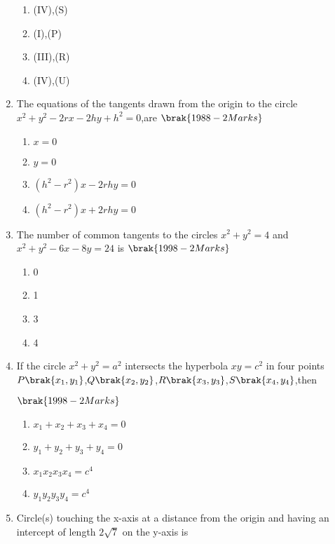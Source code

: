 \begin{enumerate}
\begin{enumerate}[label=(\alph*)] 
 \item (IV),(S)
 \item (I),(P)
 \item (III),(R)    
 \item (IV),(U)

  
  \end{enumerate}
\item The equations of the tangents drawn from the origin to the circle $x^2+y^2-2rx-2hy+h^2=0$,are
    \hfill$\brak{1988-2 Marks}$
    \begin{multicols}{2}
\begin{enumerate}
    \item $x=0$
    \item $y=0$
    \item $(h^2-r^2)x-2rhy=0$
    \item $(h^2-r^2)x+2rhy=0$
\end{enumerate}
\end{multicols}
\item The number of common tangents to the circles $x^2+y^2=4$ and $x^2+y^2-6x-8y=24$ is 
    \hfill$\brak{1998-2 Marks}$
    \begin{multicols}{2}
\begin{enumerate}
    \item 0
    \item 1 
    \item 3
    \item 4
\end{enumerate}
\end{multicols}
\item If the circle $x^2+y^2=a^2$ intersects the hyperbola $xy=c^2$ in four points $P\brak{x_1,y_1}$,$Q\brak{x_2,y_2}$,$R\brak{x_3,y_3}$,$S\brak{x_4,y_4}$,then

    \hfill$\brak{1998-2 Marks}$
\begin{multicols}{2}
\begin{enumerate}
    \item $x_1+x_2+x_3+x_4=0$
    \item $y_1+y_2+y_3+y_4=0$
    \item $x_1x_2x_3x_4=c^4$
    \item $y_1y_2y_3y_4=c^4$

\end{enumerate}
\end{multicols}
\item Circle(s) touching the x-axis at a distance  from the origin and having an intercept of length $2\sqrt{7}$ on the y-axis is 


\end{enumerate}
